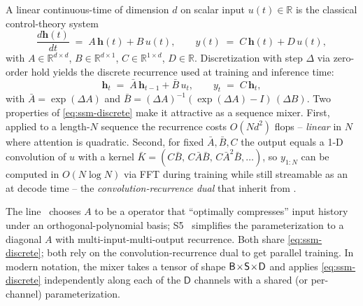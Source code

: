 A linear continuous-time  of dimension $d$ on scalar input
$u(t) \in \mathbb{R}$ is the classical control-theory system
\begin{equation}
  \frac{d \boldsymbol{h}(t)}{d t} \;=\; A\,\boldsymbol{h}(t) + B\,u(t),
  \qquad
  y(t) \;=\; C\,\boldsymbol{h}(t) + D\,u(t),
  \label{eq:ssm-continuous}
\end{equation}
with $A \in \mathbb{R}^{d \times d}$, $B \in \mathbb{R}^{d \times 1}$,
$C \in \mathbb{R}^{1 \times d}$, $D \in
\mathbb{R}$. Discretization with step $\Delta$ via
zero-order hold yields the discrete recurrence used at training and
inference time:
\begin{equation}
  \boldsymbol{h}_t \;=\; \bar{A}\,\boldsymbol{h}_{t-1} + \bar{B}\,u_t,
  \qquad
  y_t \;=\; C\,\boldsymbol{h}_t,
  \tag{Mamba--Eq.~2a}
  \label{eq:ssm-discrete}
\end{equation}
with $\bar{A} = \exp(\Delta A)$ and $\bar{B} =
(\Delta A)^{-1}(\exp(\Delta A) - I)\,(\Delta B)$. Two
properties of \eqref{eq:ssm-discrete} make it attractive as a sequence
mixer. First, applied to a length-$N$ sequence the recurrence costs
$O(N d^2)$ flops -- \emph{linear} in $N$ where attention is quadratic.
Second, for fixed $\bar{A}, \bar{B}, C$ the output equals a 1-D
convolution of $u$ with a kernel
$\bar{K} = (C\bar{B},\, C\bar{A}\bar{B},\, C\bar{A}^2\bar{B}, \ldots)$,
so $y_{1:N}$ can be computed in $O(N \log N)$ via FFT during training
while still streamable as an  at decode time -- the
\emph{convolution-recurrence dual} that \citet{gu2023-mamba} inherit
from .

The  line~\citep[no KB entry; ]{}
chooses $A$ to be a  operator that ``optimally compresses'' input
history under an orthogonal-polynomial basis; S5~ simplifies the parameterization to a diagonal
$A$ with multi-input-multi-output recurrence. Both share
\eqref{eq:ssm-discrete}; both rely on the convolution-recurrence dual to
get parallel training. In modern  notation, the  mixer
takes a tensor of shape $\mathsf{B}\!\times\!\mathsf{S}\!\times\!\mathsf{D}$ and applies \eqref{eq:ssm-discrete}
independently along each of the $\mathsf{D}$  channels with a
shared (or per-channel) parameterization.

